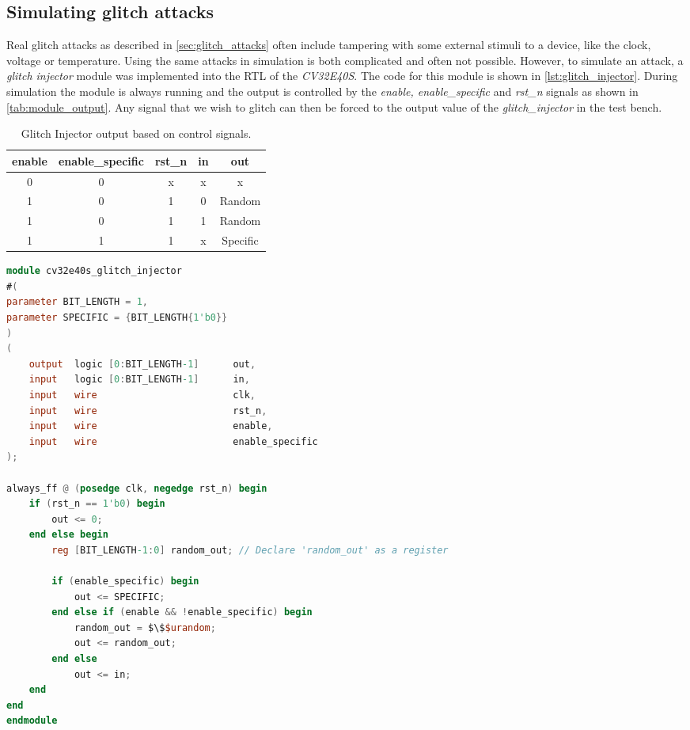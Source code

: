 \subsection{Simulating glitch attacks}
\label{subsec:sim_glitch}

Real glitch attacks as described in \autoref{sec:glitch_attacks} often include tampering with some external stimuli to a device, like the clock, voltage or temperature. Using the same attacks in simulation is both complicated and often not possible. However, to simulate an attack, a \textit{glitch injector} module was implemented into the RTL of the \textit{CV32E40S}. The code for this module is shown in \autoref{lst:glitch_injector}. During simulation the module is always running and the output is controlled by the \textit{enable, enable\_specific} and \textit{rst\_n} signals as shown in \autoref{tab:module_output}. Any signal that we wish to glitch can then be forced to the output value of the \textit{glitch\_injector} in the test bench. 

\begin{table}[h]
\centering
\caption{Glitch Injector output based on control signals.}
\label{tab:module_output}
\begin{tabular}{ccccc}
\toprule 
\rowcolor{black!20} \textbf{enable} & \textbf{enable\_specific} & \textbf{rst\_n} & \textbf{in} & \textbf{out} \\
\midrule
0 & 0 & x & x & x \\
\rowcolor{black!20} 1 & 0 & 1 & 0 & Random \\
1 & 0 & 1 & 1 & Random \\
\rowcolor{black!20} 1 & 1 & 1 & x & Specific \\
\bottomrule
\end{tabular}
\end{table}

\begin{lstlisting}[caption={SystemVerilog code for the glitch\_injector module}, label=lst:glitch_injector, language=verilog]
module cv32e40s_glitch_injector 
#(
parameter BIT_LENGTH = 1, 
parameter SPECIFIC = {BIT_LENGTH{1'b0}}
)
(
    output  logic [0:BIT_LENGTH-1]      out,
    input   logic [0:BIT_LENGTH-1]      in,
    input   wire                        clk,
    input   wire                        rst_n,
    input   wire                        enable,
    input   wire                        enable_specific    
);

always_ff @ (posedge clk, negedge rst_n) begin 
    if (rst_n == 1'b0) begin 
        out <= 0;
    end else begin
        reg [BIT_LENGTH-1:0] random_out; // Declare 'random_out' as a register

        if (enable_specific) begin
            out <= SPECIFIC;
        end else if (enable && !enable_specific) begin
            random_out = $\$$urandom;
            out <= random_out; 
        end else
            out <= in;  
    end
end
endmodule
\end{lstlisting}

